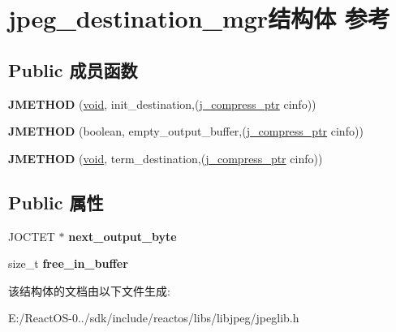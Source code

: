 \hypertarget{structjpeg__destination__mgr}{}\section{jpeg\+\_\+destination\+\_\+mgr结构体 参考}
\label{structjpeg__destination__mgr}
\subsection*{Public 成员函数}
\begin{DoxyCompactItemize}
\item 
\mbox{\label{structjpeg__destination__mgr_ae29d14eb632140c7c67eda8c5824383c}} 
{\bfseries J\+M\+E\+T\+H\+OD} (\hyperlink{interfacevoid}{void}, init\+\_\+destination,(\hyperlink{structjpeg__compress__struct}{j\+\_\+compress\+\_\+ptr} cinfo))
\item 
\mbox{\label{structjpeg__destination__mgr_a7357b5d5cab543cfa243dd59f101b8f2}} 
{\bfseries J\+M\+E\+T\+H\+OD} (boolean, empty\+\_\+output\+\_\+buffer,(\hyperlink{structjpeg__compress__struct}{j\+\_\+compress\+\_\+ptr} cinfo))
\item 
\mbox{\label{structjpeg__destination__mgr_a1158df5e49ecfa2a7d0905eef216afbf}} 
{\bfseries J\+M\+E\+T\+H\+OD} (\hyperlink{interfacevoid}{void}, term\+\_\+destination,(\hyperlink{structjpeg__compress__struct}{j\+\_\+compress\+\_\+ptr} cinfo))
\end{DoxyCompactItemize}
\subsection*{Public 属性}
\begin{DoxyCompactItemize}
\item 
\mbox{\label{structjpeg__destination__mgr_a3dac0ab8cc4daeb1efb9fea2e07449c0}} 
J\+O\+C\+T\+ET $\ast$ {\bfseries next\+\_\+output\+\_\+byte}
\item 
\mbox{\label{structjpeg__destination__mgr_a397cc63a089447fe96e35062c4979906}} 
size\+\_\+t {\bfseries free\+\_\+in\+\_\+buffer}
\end{DoxyCompactItemize}


该结构体的文档由以下文件生成\+:\begin{DoxyCompactItemize}
\item 
E\+:/\+React\+O\+S-\/0../sdk/include/reactos/libs/libjpeg/jpeglib.\+h\end{DoxyCompactItemize}
